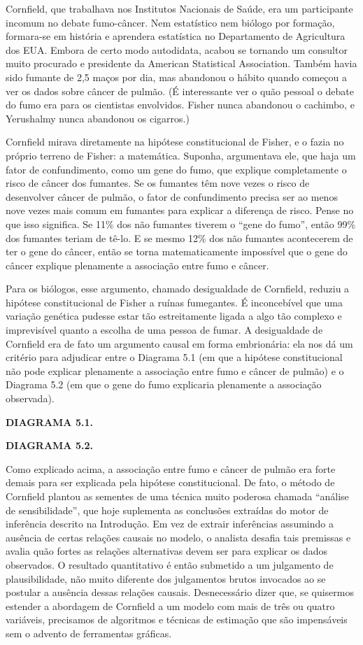 \documentclass[11pt,a5paper,twoside]{book}
\begin{document}
Cornfield, que trabalhava nos Institutos Nacionais de Saúde, era um participante incomum no debate fumo-câncer. Nem estatístico nem biólogo por formação, formara-se em história e aprendera estatística no Departamento de Agricultura dos EUA. Embora de certo modo autodidata, acabou se tornando um consultor muito procurado e presidente da American Statistical Association. Também havia sido fumante de 2,5 maços por dia, mas abandonou o hábito quando começou a ver os dados sobre câncer de pulmão. (É interessante ver o quão pessoal o debate do fumo era para os cientistas envolvidos. Fisher nunca abandonou o cachimbo, e Yerushalmy nunca abandonou os cigarros.)

Cornfield mirava diretamente na hipótese constitucional de Fisher, e o fazia no próprio terreno de Fisher: a matemática. Suponha, argumentava ele, que haja um fator de confundimento, como um gene do fumo, que explique completamente o risco de câncer dos fumantes. Se os fumantes têm nove vezes o risco de desenvolver câncer de pulmão, o fator de confundimento precisa ser ao menos nove vezes mais comum em fumantes para explicar a diferença de risco. Pense no que isso significa. Se 11\% dos não fumantes tiverem o “gene do fumo”, então 99\% dos fumantes teriam de tê-lo. E se mesmo 12\% dos não fumantes acontecerem de ter o gene do câncer, então se torna matematicamente impossível que o gene do câncer explique plenamente a associação entre fumo e câncer.

Para os biólogos, esse argumento, chamado desigualdade de Cornfield, reduziu a hipótese constitucional de Fisher a ruínas fumegantes. É inconcebível que uma variação genética pudesse estar tão estreitamente ligada a algo tão complexo e imprevisível quanto a escolha de uma pessoa de fumar. A desigualdade de Cornfield era de fato um argumento causal em forma embrionária: ela nos dá um critério para adjudicar entre o Diagrama 5.1 (em que a hipótese constitucional não pode explicar plenamente a associação entre fumo e câncer de pulmão) e o Diagrama 5.2 (em que o gene do fumo explicaria plenamente a associação observada).

\textbf{DIAGRAMA 5.1.}

\textbf{DIAGRAMA 5.2.}

Como explicado acima, a associação entre fumo e câncer de pulmão era forte demais para ser explicada pela hipótese constitucional. De fato, o método de Cornfield plantou as sementes de uma técnica muito poderosa chamada “análise de sensibilidade”, que hoje suplementa as conclusões extraídas do motor de inferência descrito na Introdução. Em vez de extrair inferências assumindo a ausência de certas relações causais no modelo, o analista desafia tais premissas e avalia quão fortes as relações alternativas devem ser para explicar os dados observados. O resultado quantitativo é então submetido a um julgamento de plausibilidade, não muito diferente dos julgamentos brutos invocados ao se postular a ausência dessas relações causais. Desnecessário dizer que, se quisermos estender a abordagem de Cornfield a um modelo com mais de três ou quatro variáveis, precisamos de algoritmos e técnicas de estimação que são impensáveis sem o advento de ferramentas gráficas.
\end{document}
